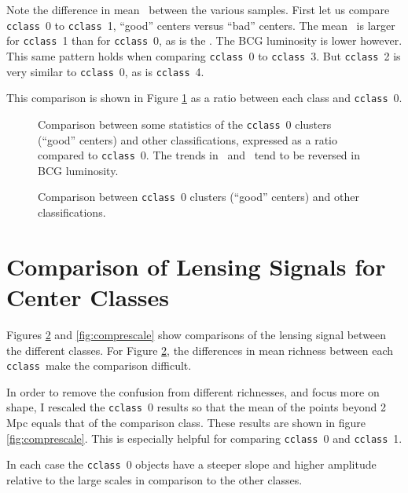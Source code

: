 \documentclass[12pt,preprint]{aastex}
\newcommand{\cclass}{\texttt{cclass}}
\begin{document}
Note the difference in mean \nvir\ between the various samples.   First let us
compare \cclass\ 0 to \cclass\ 1, ``good'' centers versus ``bad'' centers.  The
mean \nvir\ is larger for \cclass\ 1 than for \cclass\ 0, as is the \lvir.  The 
BCG luminosity is lower however.  This same pattern holds when comparing
\cclass\ 0 to \cclass\ 3.  But \cclass\ 2 is very similar to \cclass\ 0, 
as is \cclass\ 4.

This comparison is shown in Figure \ref{fig:compstat} as a ratio between
each class and \cclass\ 0.

\begin{figure}[h]

\caption{Comparison between some statistics of the \cclass\ 0 clusters
(``good'' centers) and other classifications, expressed as a ratio
compared to \cclass\ 0.  The trends in \nvir\ and \lvir\ tend
to be reversed in BCG luminosity.} \label{fig:compstat}

\end{figure}

\begin{figure}[h]

\caption{Comparison between \cclass\ 0 clusters (``good'' centers) and other
classifications.} \label{fig:comp}

\end{figure}






\section{Comparison of Lensing Signals for Center Classes}

Figures \ref{fig:comp} and \ref{fig:comprescale} show comparisons of the
lensing signal between the different classes.  For Figure \ref{fig:comp}, the
differences in mean richness between each \cclass\ make the comparison difficult. 

In order to remove the confusion from different richnesses, and focus more on
shape,  I rescaled the \cclass\ 0 results so that the mean of the
points beyond 2 Mpc equals that of the comparison class. These results are shown
in figure \ref{fig:comprescale}.  This is especially helpful for comparing
\cclass\ 0 and \cclass\ 1.

In each case the \cclass\ 0 objects have a steeper slope and higher amplitude
relative to the large scales in comparison to the other classes. 
\end{document}
